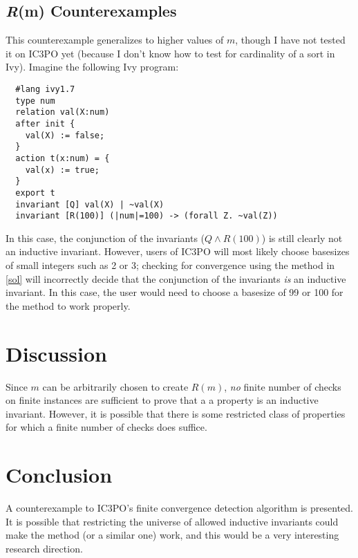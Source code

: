 \documentclass[12pt]{article}
\begin{document}
\subsection{\textit{R}(m) Counterexamples}
This counterexample generalizes to higher values of $m$, though I have not tested it on IC3PO yet (because I don't know how to test for cardinality of a sort in Ivy).  Imagine the following Ivy program:

\begin{verbatim}
  #lang ivy1.7
  type num
  relation val(X:num)
  after init {
    val(X) := false;
  }
  action t(x:num) = {
    val(x) := true;
  }
  export t
  invariant [Q] val(X) | ~val(X)
  invariant [R(100)] (|num|=100) -> (forall Z. ~val(Z))
\end{verbatim}

In this case, the conjunction of the invariants ($Q \land R(100)$) is still clearly not an inductive invariant.  However, users of IC3PO will most likely choose basesizes of small integers such as 2 or 3; checking for convergence using the method in \ref{sol} will incorrectly decide that the conjunction of the invariants \textit{is} an inductive invariant.  In this case, the user would need to choose a basesize of 99 or 100 for the method to work properly.

\section{Discussion}
Since $m$ can be arbitrarily chosen to create $R(m)$, \textit{no} finite number of checks on finite instances are sufficient to prove that a a property is an inductive invariant.  However, it is possible that there is some restricted class of properties for which a finite number of checks does suffice.

\section{Conclusion}
A counterexample to IC3PO's finite convergence detection algorithm is presented.  It is possible that restricting the universe of allowed inductive invariants could make the method (or a similar one) work, and this would be a very interesting research direction.




\end{document}
